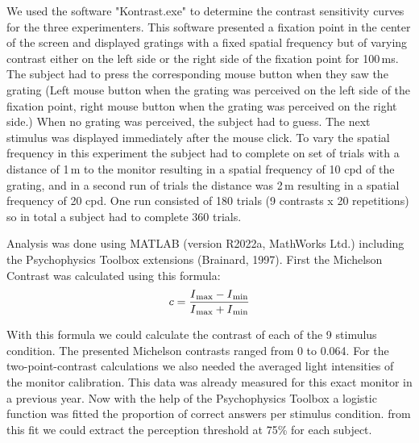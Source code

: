  We used the software "Kontrast.exe" to determine the contrast sensitivity curves for the three experimenters. This software presented a fixation point in the center of the screen and displayed gratings with a fixed spatial frequency but of varying contrast either on the left side or the right side of the fixation point for 100\,ms. The subject had to press the corresponding mouse button when they saw the grating (Left mouse button when the grating was perceived on the left side of the fixation point, right mouse button when the grating was perceived on the right side.) When no grating was perceived, the subject had to guess. The next stimulus was displayed immediately after the mouse click. To vary the spatial frequency in this experiment the subject had to complete on set of trials with a distance of 1\,m to the monitor resulting in a spatial frequency of 10 cpd of the grating, and in a second run of trials the distance was 2\,m resulting in a spatial frequency of 20 cpd. One run consisted of 180 trials (9 contrasts x 20 repetitions) so in total a subject had to complete 360 trials.

Analysis was done using MATLAB (version R2022a, MathWorks Ltd.) including the Psychophysics Toolbox extensions (Brainard, 1997). First the Michelson Contrast was calculated using  this formula:
\[
c = \frac{I\textsubscript{max}-I\textsubscript{min}}{I\textsubscript{max}+I\textsubscript{min}}
\]

With this formula we could calculate the contrast of each of the 9 stimulus condition. The presented Michelson contrasts ranged from 0 to 0.064. For the two-point-contrast calculations we also needed the averaged light intensities of the monitor calibration. This data was already measured for this exact monitor in a previous year. Now with the help of the Psychophysics Toolbox a logistic function was fitted the proportion of correct answers per stimulus condition. from this fit we could extract the perception threshold at 75\% for each subject. 

